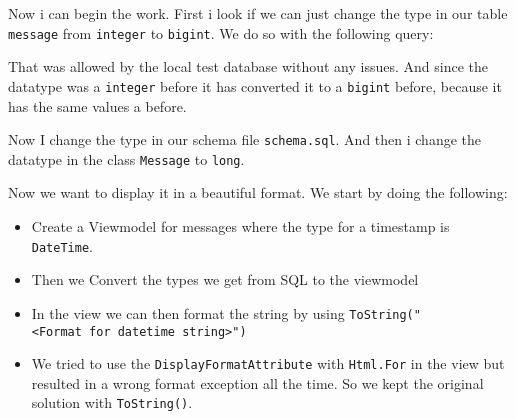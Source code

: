 

Now i can begin the work. First i look if we can just change the type in our table \texttt{message} from \texttt{integer} to \texttt{bigint}. We do so with the following query:


That was allowed by the local test database without any issues. And since the datatype was a \texttt{integer} before it has converted it to a \texttt{bigint} before, because it has the same values a before.

Now I change the type in our schema file \texttt{schema.sql}. And then i change the datatype in the class \texttt{Message} to
\texttt{long}.

Now we want to display it in a beautiful format. We start by doing the following:

\begin{itemize}
    \item Create a Viewmodel for messages where the type for a timestamp is \texttt{DateTime}.
    \item Then we Convert the types we get from SQL to the viewmodel
    \item In the view we can then format the string by using \texttt{ToString("\textless{}Format\ for\ datetime\ string\textgreater{}")}
    \item We tried to use the \texttt{DisplayFormatAttribute} with \texttt{Html.For} in the view but resulted in a wrong format exception all the time. So we kept the original solution with \texttt{ToString()}.
\end{itemize}

